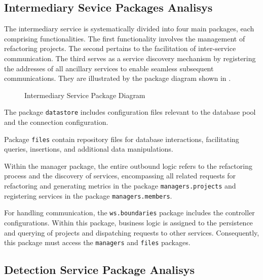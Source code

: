 \subsection{Intermediary Sevice Packages Analisys}
\label{sub-intermediary-packages}
The intermediary service is systematically divided into four main packages, each comprising functionalities. The first functionality involves the management of refactoring projects. The second pertains to the facilitation of inter-service communication. The third serves as a service discovery mechanism by registering the addresses of all ancillary services to enable seamless subsequent communications. They are illustrated by the package diagram shown in .

\begin{figure}[ht!]
\SetCaptionWidth{\textwidth}
\caption{Intermediary Service Package Diagram}
\label{fig-package-intermediary}

\end{figure}
\FloatBarrier

The package \texttt{datastore} includes configuration files relevant to the database pool and the connection configuration.

Package \texttt{files} contain repository files for database interactions, facilitating queries, insertions, and additional data manipulations.

Within the manager package, the entire outbound logic refers to the refactoring process and the discovery of services, encompassing all related requests for refactoring and generating metrics in the package \texttt{managers.projects} and registering services in the package \texttt{managers.members}.

For handling communication, the \texttt{ws.boundaries} package includes the controller configurations. Within this package, business logic is assigned to the persistence and querying of projects and dispatching requests to other services. Consequently, this package must access the \texttt{managers} and \texttt{files} packages.

\subsection{Detection Service Package Analisys}
\label{sub-detection-packages}

